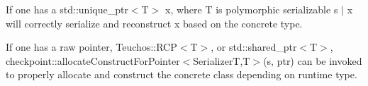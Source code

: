 \begin{DoxyItemize}
\item If one has a {\ttfamily std\+::unique\+\_\+ptr$<$T$>$ x}, where {\ttfamily T} is polymorphic serializable {\ttfamily s $\vert$ x} will correctly serialize and reconstruct {\ttfamily x} based on the concrete type.
\item If one has a raw pointer, {\ttfamily Teuchos\+::\+R\+CP$<$T$>$}, or {\ttfamily std\+::shared\+\_\+ptr$<$T$>$}, {\ttfamily checkpoint\+::allocate\+Construct\+For\+Pointer$<$SerializerT,T$>$(s, ptr)} can be invoked to properly allocate and construct the concrete class depending on runtime type. 
\end{DoxyItemize}